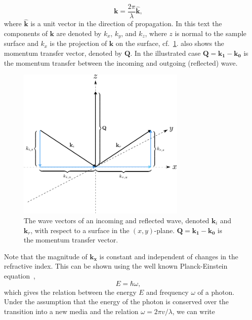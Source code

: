\documentclass[10pt,twoside, b5paper,pdftex]{report}
\begin{document}
\begin{equation}
{\mathbf k} = \frac{2\pi}{\lambda}\widehat{ {\mathbf k}} ,
\label{eq:k_ray}
\end{equation} 
%
where $\widehat{ {\mathbf k}}$ is a unit vector in the direction of propagation. In this text the components of $\mathbf{k}$ are denoted by $k_{x}$, $k_{y}$, and $k_{z}$, where $z$ is normal to the sample surface and $k_{x}$ is the projection of $\mathbf{k}$ on the surface, cf.~\cref{fig:xyz}.  also shows the momentum transfer vector, denoted by $\mathbf{Q}$. In the illustrated case $\mathbf{Q} = \mathbf{k_{1}} - \mathbf{k_{0}}$ is the momentum transfer between the incoming and outgoing (reflected) wave. 
\begin{figure}[htbp]
	\begin{center}
		\includegraphics[width=0.73\textwidth]{figures/xyz.pdf}		
	\end{center}
	\caption{The wave vectors of an incoming and reflected wave, denoted $\mathbf{k}_i$ and $\mathbf{k}_r$, with respect to a surface in the $(x , y)$-plane. $\mathbf{Q} = \mathbf{k_{1}} - \mathbf{k_{0}}$ is the momentum transfer vector. \label{fig:xyz}}
\end{figure}
Note that the magnitude of $\mathbf{k_{x}}$ is constant and independent of changes in the refractive index. This can be shown using the well known Planck-Einstein equation~\cite{SCHIFF},  
\begin{equation}
E = \hbar\omega , 
\label{eq:planck_einstein}
\end{equation} 
%
which gives the relation between the energy $E$ and frequency $\omega$ of a photon. Under the assumption that the energy of the photon is conserved over the transition into a new media and the relation $\omega = 2\pi v/\lambda$, we can write
\end{document}
